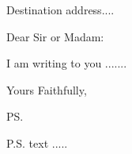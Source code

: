 \documentclass{letter}
\begin{document}
\begin{letter}{Destination address....}
\opening{Dear Sir or Madam:}

I am writing to you .......

\closing{Yours Faithfully,}

\ps

P.S. text .....


\end{letter}
\end{document}
